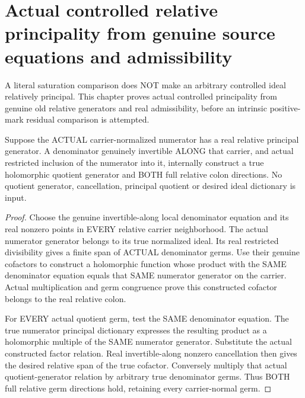 \section{Actual controlled relative principality from genuine source equations and admissibility}

A literal saturation comparison does NOT make an arbitrary controlled ideal
relatively principal. This chapter proves actual controlled principality
from genuine old relative generators and real admissibility, before an
intrinsic positive-mark residual comparison is attempted.

\begin{lemma}
\label{hir:sharp-actual-relative-colon-genuine-cofactor-principal}
\leanok
Suppose the ACTUAL carrier-normalized numerator has a real relative
principal generator. A denominator genuinely invertible ALONG that carrier,
and actual restricted inclusion of the numerator into it, internally
construct a true holomorphic quotient generator and BOTH full relative
colon directions. No quotient generator, cancellation, principal quotient
or desired ideal dictionary is input.
\end{lemma}
\begin{proof}
Choose the genuine invertible-along local denominator equation and its
real nonzero points in EVERY relative carrier neighborhood. The actual
numerator generator belongs to its true normalized ideal. Its real
restricted divisibility gives a finite span of ACTUAL denominator germs.
Use their genuine cofactors to construct a holomorphic function whose
product with the SAME denominator equation equals that SAME numerator
generator on the carrier. Actual multiplication and germ congruence prove
this constructed cofactor belongs to the real relative colon.

For EVERY actual quotient germ, test the SAME denominator equation. The
true numerator principal dictionary expresses the resulting product as a
holomorphic multiple of the SAME numerator generator. Substitute the
actual constructed factor relation. Real invertible-along nonzero
cancellation then gives the desired relative span of the true cofactor.
Conversely multiply that actual quotient-generator relation by arbitrary
true denominator germs. Thus BOTH full relative germ directions hold,
retaining every carrier-normal germ.
\end{proof}

